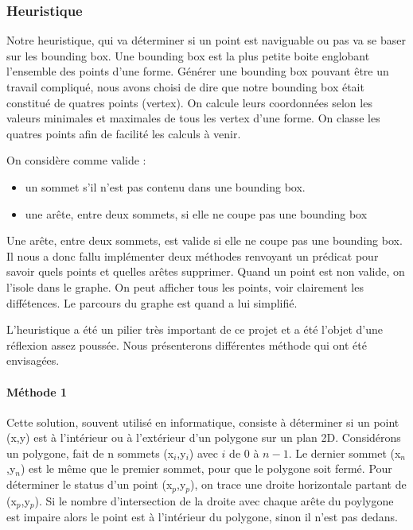 \documentclass[a4paper,12pt]{report}
\begin{document}
\subsubsection{Heuristique}

Notre heuristique, qui va déterminer si un point est naviguable ou pas va se baser sur les bounding box. Une bounding box est la plus petite boite englobant l'ensemble des points d'une forme. Générer une bounding box pouvant être un travail compliqué, nous avons choisi de dire que notre bounding box était constitué de quatres points (vertex). On calcule leurs coordonnées selon les valeurs minimales et maximales de tous les vertex d'une forme. On classe les quatres points afin de facilité les calculs à venir.

On considère comme valide :
\begin{itemize}
 \item un sommet s'il n'est pas contenu dans une bounding box. 
 \item une arête, entre deux sommets, si elle ne coupe pas une bounding box
\end{itemize}

Une arête, entre deux sommets, est valide si elle ne coupe pas une bounding box. Il nous a donc fallu implémenter deux méthodes renvoyant un prédicat pour savoir quels points et quelles arêtes supprimer. 
Quand un point est non valide, on l'isole dans le graphe. On peut afficher tous les points, voir clairement les diffétences. Le parcours du graphe est quand a lui simplifié.

L'heuristique a été un pilier très important de ce projet et a été l'objet d'une réflexion assez poussée. Nous présenterons différentes méthode qui ont été envisagées.

\paragraph{Méthode 1 }
Cette solution, souvent utilisé en informatique, consiste à déterminer si un point (x,y) est à l'intérieur ou à l'extérieur d'un
polygone sur un plan 2D. 
Considérons un polygone, fait de n sommets (x$_{i}$,y$_{i}$) avec $i$ de $0$ à $n-1$. Le dernier sommet (x$_{n}$,y$_{n}$) est le même que le premier sommet, pour que le polygone soit fermé. 
Pour déterminer le status d'un point (x$_{p}$,y$_{p}$), on trace une droite horizontale partant de (x$_{p}$,y$_{p}$). 
Si le nombre d'intersection de la droite avec chaque arête du poylygone est impaire alors le point est à l'intérieur du polygone, sinon il n'est pas dedans.
\end{document}
